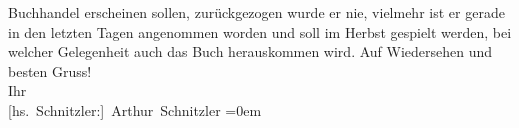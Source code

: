                     Buchhandel erscheinen sollen, zurückgezogen wurde er nie, vielmehr ist er gerade
                    in den letzten Tagen angenommen worden und soll im Herbst gespielt werden, bei
                    welcher Gelegenheit auch das Buch herauskommen wird.\pend
           \pstart
           Auf Wiedersehen und besten Gruss!{\\[\baselineskip]}Ihr{\\[\baselineskip]}\spacefill\mbox{{[}hs. Schnitzler:{]} Arthur Schnitzler}\pend
           \leftskip=0em{}\endnumbering{}  
      